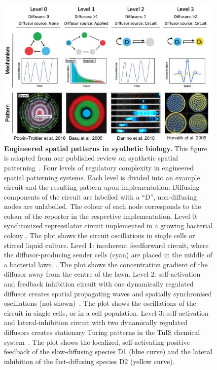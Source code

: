 \begin{figure}[H]
    \centering
    \includegraphics[width=1\textwidth]{chapters/Introduction/spatial_components}
    \caption{\textbf{Engineered spatial patterns in synthetic biology.} This figure is adapted from our published review on synthetic spatial patterning~\parencite{oliverhuidobro}. Four levels of regulatory complexity in engineered spatial patterning systems. Each level is divided into an example circuit and the resulting pattern upon implementation. Diffusing components of the circuit are labelled with a “D”, non-diffusing nodes are unlabelled. The colour of each node corresponds to the colour of the reporter in the respective implementation. Level 0: synchronized repressilator circuit implemented in a growing bacterial colony \parencite{Potvin-Trottier2016}. The plot shows the circuit oscillations in single cells or stirred liquid culture. Level 1: incoherent feedforward circuit, where the diffusor-producing sender cells (cyan) are placed in the middle of a bacterial lawn~\parencite{Basu2005}. The plot shows the concentration gradient of the diffusor away from the centre of the lawn. Level 2: self-activation and feedback inhibition circuit with one dynamically regulated diffusor creates spatial propagating waves and spatially synchronised oscillations (not shown)~\parencite{Danino2010}. The plot shows the oscillations of the circuit in single cells, or in a cell population. Level 3: self-activation and lateral-inhibition circuit with two dynamically regulated diffusors creates stationary Turing patterns in the TuIS chemical system~\parencite{Horvath}. The plot shows the localized, self-activating positive feedback of the slow-diffusing species D1 (blue curve) and the lateral inhibition of the fast-diffusing species D2 (yellow curve).}
    \label{fig:engineered_patterns}
\end{figure}

